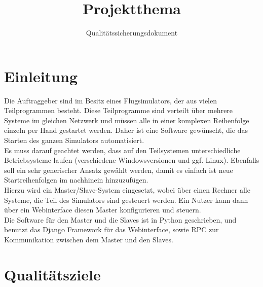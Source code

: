 \documentclass[accentcolor=tud9c,12pt,paper=a4]{tudreport}
\title{Projektthema}
\subtitle{Qualitätssicherungsdokument}
\begin{document}
	\maketitle
	\tableofcontents

	\chapter{Einleitung}
		Die Auftraggeber sind im Besitz eines Flugsimulators, der aus vielen 
		Teilprogrammen besteht. Diese Teilprogramme sind verteilt über mehrere Systeme im
		gleichen Netzwerk und müssen alle in einer komplexen Reihenfolge einzeln per Hand 
		gestartet werden. Daher ist eine Software gewünscht, die das Starten des ganzen
		Simulators automatisiert.\\[5pt]
		Es muss darauf geachtet werden, dass auf den Teilsystemen unterschiedliche 
		Betriebsysteme laufen (verschiedene Windowsversionen und ggf. Linux). Ebenfalls 
		soll ein sehr generischer Ansatz gewählt werden, damit es einfach ist neue 
		Startreihenfolgen im nachhinein hinzuzufügen.\\[5pt]
		Hierzu wird ein Master/Slave-System eingesetzt, wobei über einen Rechner alle 
		Systeme, die Teil des Simulators sind gesteuert werden. Ein Nutzer kann dann über
		ein Webinterface diesen Master konfigurieren und steuern.\\[5pt]
		Die Software für den Master und die Slaves ist in Python geschrieben, und benutzt
		das Django Framework für das Webinterface, sowie RPC zur Kommunikation zwischen 
		dem Master und den Slaves.
		

	\chapter{Qualitätsziele}
\end{document}
